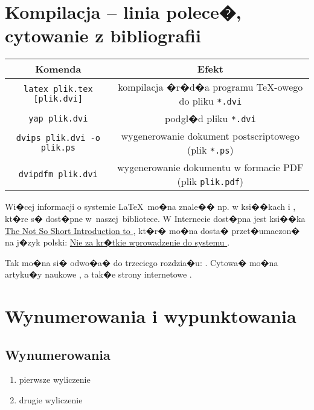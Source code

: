 \documentclass[11pt,wide]{mwart}
\begin{document}
\section{Kompilacja -- linia polece�, cytowanie z bibliografii}

\begin{center}
	\small
	\begin{tabular}{|c|c|}
	Komenda & Efekt\\ \hline\hline\hline
	\verb"latex plik.tex [plik.dvi]" & kompilacja �r�d�a programu
	\TeX-owego do pliku \verb+*.dvi+\\
	\verb"yap plik.dvi" & podgl�d pliku \verb+*.dvi+\\ \hline
	\verb"dvips plik.dvi -o plik.ps" & wygenerowanie dokument
	postscriptowego (plik \verb+*.ps+)\\ \hline
	\verb"dvipdfm plik.dvi" & wygenerowanie dokumentu w formacie PDF (plik
	\verb+plik.pdf+)\\ \hline
	\end{tabular}
\end{center}
Wi�cej informacji o systemie \LaTeX~mo�na znale�� np. w ksi��kach \cite{JK} i
\cite{LL}, kt�re s� dost�pne w~naszej~bibliotece. W Internecie dost�pna jest
ksi��ka
\href{http://tobi.oetiker.ch/lshort/lshort.pdf}{The Not So
Short Introduction to \LaTeXe}, kt�r� mo�na dosta� przet�umaczon� na j�zyk
polski:
\href{ftp://sunsite.icm.edu.pl/pub/CTAN/info/lshort/polish/lshort2e.pdf}{Nie za
kr�tkie wprowadzenie do systemu \LaTeXe}.

\noindent Tak mo�na si� odwo�a� do trzeciego rozdzia�u: \cite[\S3]{JK}. Cytowa� mo�na artyku�y naukowe \cite{WL09}, a tak�e
strony internetowe \cite{II}.



\section{Wynumerowania i wypunktowania}

\subsection{Wynumerowania}

\begin{enumerate}
\itemsep 3pt%
\item pierwsze wyliczenie
\item drugie wyliczenie
\end{enumerate}
\end{document}
